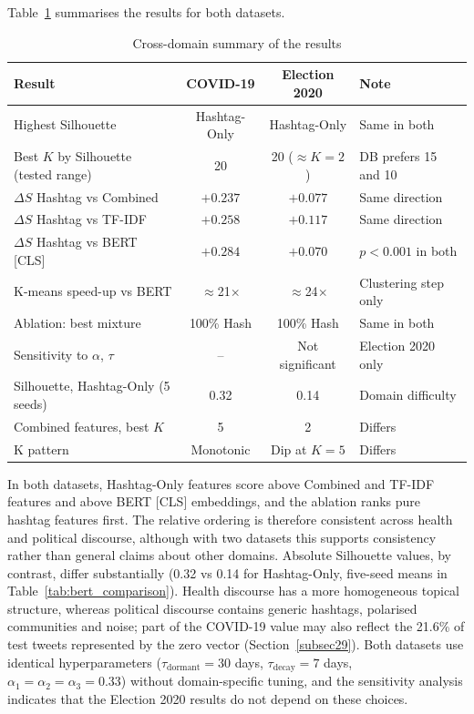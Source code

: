 \documentclass[pdflatex,sn-mathphys-num]{sn-jnl}%
\begin{document}
Table~\ref{tab:cross_domain} summarises the results for both datasets.

\begin{table}[t]
\centering
\caption{Cross-domain summary of the results}
\label{tab:cross_domain}
\footnotesize
\begin{tabular}{lccl}
\toprule
Result & COVID-19 & Election 2020 & Note \\
\midrule
Highest Silhouette & Hashtag-Only & Hashtag-Only & Same in both \\
Best $K$ by Silhouette (tested range) & 20 & 20 ($\approx K=2$) & DB prefers 15 and 10 \\
$\Delta S$ Hashtag vs Combined & $+0.237$ & $+0.077$ & Same direction \\
$\Delta S$ Hashtag vs TF-IDF & $+0.258$ & $+0.117$ & Same direction \\
$\Delta S$ Hashtag vs BERT [CLS] & $+0.284$ & $+0.070$ & $p<0.001$ in both \\
K-means speed-up vs BERT & $\approx$21$\times$ & $\approx$24$\times$ & Clustering step only \\
Ablation: best mixture & 100\% Hash & 100\% Hash & Same in both \\
Sensitivity to $\alpha$, $\tau$ & -- & Not significant & Election 2020 only \\
\midrule
Silhouette, Hashtag-Only (5 seeds) & 0.32 & 0.14 & Domain difficulty \\
Combined features, best $K$ & 5 & 2 & Differs \\
K pattern & Monotonic & Dip at $K=5$ & Differs \\
\bottomrule
\end{tabular}
\end{table}

In both datasets, Hashtag-Only features score above Combined and TF-IDF features and above BERT [CLS] embeddings, and the ablation ranks pure hashtag features first. The relative ordering is therefore consistent across health and political discourse, although with two datasets this supports consistency rather than general claims about other domains. Absolute Silhouette values, by contrast, differ substantially (0.32 vs 0.14 for Hashtag-Only, five-seed means in Table~\ref{tab:bert_comparison}). Health discourse has a more homogeneous topical structure, whereas political discourse contains generic hashtags, polarised communities and noise; part of the COVID-19 value may also reflect the 21.6\% of test tweets represented by the zero vector (Section~\ref{subsec29}). Both datasets use identical hyperparameters ($\tau_{\text{dormant}}=30$ days, $\tau_{\text{decay}}=7$ days, $\alpha_1=\alpha_2=\alpha_3=0.33$) without domain-specific tuning, and the sensitivity analysis indicates that the Election 2020 results do not depend on these choices.
\end{document}
